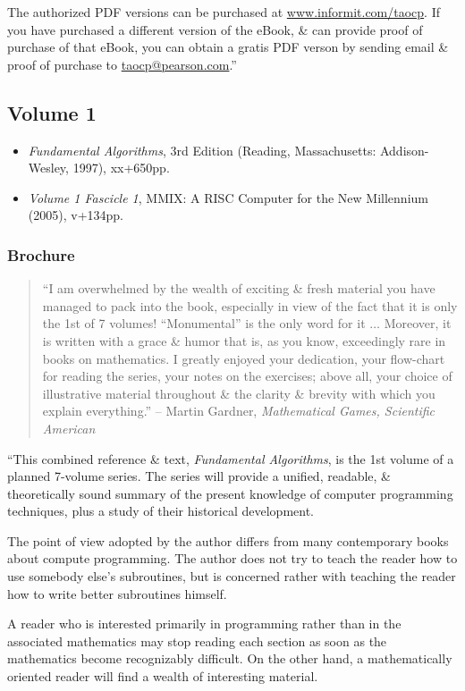 \documentclass[oneside]{book}
\numberwithin{equation}{section}
\begin{document}
The authorized PDF versions can be purchased at \url{www.informit.com/taocp}. If you have purchased a different version of the eBook, \& can provide proof of purchase of that eBook, you can obtain a gratis PDF verson by sending email \& proof of purchase to \url{taocp@pearson.com}.''

\subsection*{Volume 1}
\begin{itemize}
	\item \textit{Fundamental Algorithms}, 3rd Edition (Reading, Massachusetts: Addison-Wesley, 1997), xx+650pp.
	\item \textit{Volume 1 Fascicle 1}, MMIX: A RISC Computer for the New Millennium (2005), v+134pp.
\end{itemize}

\subsubsection{Brochure}

\begin{quotation}
	``I am overwhelmed by the wealth of exciting \& fresh material you have managed to pack into the book, especially in view of the fact that it is only the 1st of 7 volumes! ``Monumental'' is the only word for it $\ldots$ Moreover, it is written with a grace \& humor that is, as you know, exceedingly rare in books on mathematics. I greatly enjoyed your dedication, your flow-chart for reading the series, your notes on the exercises; above all, your choice of illustrative material throughout \& the clarity \& brevity with which you explain everything.'' -- Martin Gardner, \textit{Mathematical Games, Scientific American}
\end{quotation}
``This combined reference \& text, \textit{Fundamental Algorithms}, is the 1st volume of a planned 7-volume series. The series will provide a unified, readable, \& theoretically sound summary of the present knowledge of computer programming techniques, plus a study of their historical development.

The point of view adopted by the author differs from many contemporary books about compute programming. The author does not try to teach the reader how to use somebody else's subroutines, but is concerned rather with teaching the reader how to write better subroutines himself.

A reader who is interested primarily in programming rather than in the associated mathematics may stop reading each section as soon as the mathematics become recognizably difficult. On the other hand, a mathematically oriented reader will find a wealth of interesting material.
\end{document}
